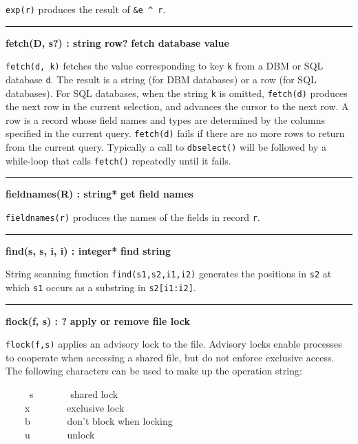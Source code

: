 \noindent
{}\texttt{exp(r)} produces the result of
\texttt{\&e \^{} r}.

\bigskip\hrule\vspace{0.1cm}
\noindent
{\bf fetch(D, s?) : string {\textbar} row? } \hfill {\bf fetch database value}

\noindent
{}\texttt{fetch(d, k)} fetches the value
corresponding to key \texttt{k} from a DBM or
SQL database \texttt{d}. The result is
a string (for DBM databases) or a row (for SQL databases). For SQL
databases, when the string \texttt{k} is omitted,
\texttt{fetch(d)} produces the next row \WarningNotThreadSafe
in the current selection, and advances the cursor to the next row. A
row is a record whose field names and types are determined by the
columns specified in the current query. \texttt{fetch(d)} fails if there are no
more rows to return from the current query. Typically a call to
\texttt{dbselect()} will be followed by a while{}-loop that calls
\texttt{fetch()} repeatedly until it fails.

\bigskip\hrule\vspace{0.1cm}
\noindent
{\bf fieldnames(R) : string* } \hfill {\bf get field names}

\noindent
{}\texttt{fieldnames(r)} produces the names of the fields in
record \texttt{r}.

\bigskip\hrule\vspace{0.1cm}
\noindent
{\bf find(s, s, i, i) : integer* } \hfill {\bf find string}

\noindent
{}String scanning function \texttt{find(s1,s2,i1,i2)} generates
the positions in \texttt{s2} at which \texttt{s1} occurs as a
substring in \texttt{s2[i1:i2]}.

\bigskip\hrule\vspace{0.1cm}
\noindent
{\bf flock(f, s) : ? } \hfill {\bf apply or remove file lock}\WarningNotThreadSafe

\noindent
{}\texttt{flock(f,s)} applies an advisory
lock to the file. Advisory locks enable processes to
cooperate when accessing a shared file, but do not enforce exclusive
access. The following characters can be used to make up the operation
string: 

\ \ \ \ \ s \ \ \ \ \ \ \ shared lock\\
 \ \ \ \ x \ \ \ \ \ \ \ exclusive lock\\
 \ \ \ \ b \ \ \ \ \ \ \ don't block when
locking\\
 \ \ \ \ u \ \ \ \ \ \ \ unlock 

